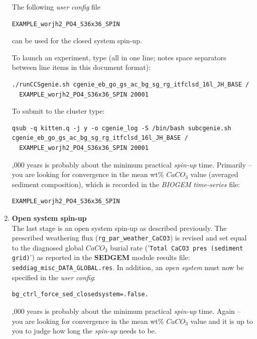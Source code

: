 \documentclass[11pt,fleqn]{book} %
\begin{document}
\begin{enumerate}
The following \textit{user config} file 
\vspace{-1mm}\begin{verbatim}EXAMPLE_worjh2_PO4_S36x36_SPIN\end{verbatim}\vspace{-1mm}
can be used for the closed system spin-up.

\noindent To launch an experiment, type (all in one line; notes space separators between line items in this document format):
\vspace{-1mm}\begin{verbatim}
./runCCSgenie.sh cgenie_eb_go_gs_ac_bg_sg_rg_itfclsd_16l_JH_BASE /
  EXAMPLE_worjh2_PO4_S36x36_SPIN 20001
\end{verbatim}\vspace{-1mm}

\noindent To submit to the cluster type:
\vspace{-1mm}\begin{verbatim}qsub -q kitten.q -j y -o cgenie_log -S /bin/bash subcgenie.sh
cgenie_eb_go_gs_ac_bg_sg_rg_itfclsd_16l_JH_BASE /
  EXAMPLE_worjh2_PO4_S36x36_SPIN 20001
\end{verbatim}\vspace{-1mm}

,000 years is probably about the minimum practical \textit{spin-up} time. Primarily -- you are looking for convergence in the mean wt\% \(CaCO_{3}\) value (averaged sediment composition), which is recorded in the \textit{BIOGEM} \textit{time-series} file:
\vspace{-1mm}\begin{verbatim}EXAMPLE_worjh2_PO4_S36x36_SPIN\end{verbatim}\vspace{-1mm}

\vspace{1mm}
\item \textbf{Open system spin-up}
\\The last stage is an open system spin-up as described previously. The prescribed weathering flux (\texttt{rg\_par\_weather\_CaCO3}) is revised and set equal to the diagnosed global \(CaCO_{3}\) burial rate ('\texttt{Total CaCO3 pres (sediment grid)}') as reported in the \textbf{SEDGEM} module results file:
\\\texttt{seddiag\_misc\_DATA\_GLOBAL.res}.
In addition, an \textit{open system} must now be specified in the \textit{user config}:
\vspace{-1mm}\begin{verbatim}bg_ctrl_force_sed_closedsystem=.false.\end{verbatim}\vspace{-1mm}

,000 years is probably about the minimum practical \textit{spin-up} time. Again -- you are looking for convergence in the mean wt\% \(CaCO_{3}\) value and it is up to you to judge how long the \textit{spin-up} needs to be.

\end{enumerate}
\end{document}
